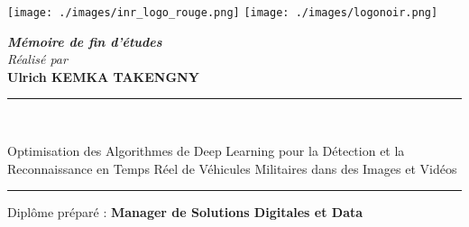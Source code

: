 \documentclass[a4paper, oneside, 12pt, final]{extreport}
\title{\reportSubject}
\author{\reportAuthor}
\newcommand{\reportTitle} {
  \textsc{Projet de Fin d'\'etudes}
}
\newcommand{\reportAuthor} {
  \textbf{Ulrich KEMKA TAKENGNY}
}
\newcommand{\reportSubject} {
Optimisation des Algorithmes de Deep Learning pour la Détection et la Reconnaissance en Temps Réel de Véhicules Militaires dans des Images et Vidéos
}
\begin{document}
\thispagestyle{empty}
\begin{titlepage}
  \begin{center}



    \texttt{[image: ./images/inr\_logo\_rouge.png]}
    \hfill
    \texttt{[image: ./images/logonoir.png]}

    \vspace{3cm}






    \textbf{\textit{Mémoire de fin d'études}}\\

    \vspace{5pt}
    {\textit{Réalisé par}}\\
    \vspace{10pt} {%
      \fontsize{14pt}{14pt}\selectfont
      {\bfseries\Large\sc \reportAuthor}\\
    }

    \vspace{10pt}

    \vspace{5pt} {
      \renewcommand*{\familydefault}{\defaultFont}
      \fontsize{27pt}{27pt}\selectfont%
      \rule{0.5\textwidth}{.4pt}\\
      \vspace{10pt}
      \reportSubject{}\\%
      \vspace{10pt}
      \rule{0.5\textwidth}{.4pt}
    }


    \vspace{30pt}
    {Diplôme préparé : \textbf{\large Manager de Solutions Digitales et Data}}\\
    \vspace{46pt}



\end{center}
\end{titlepage}
\end{document}
